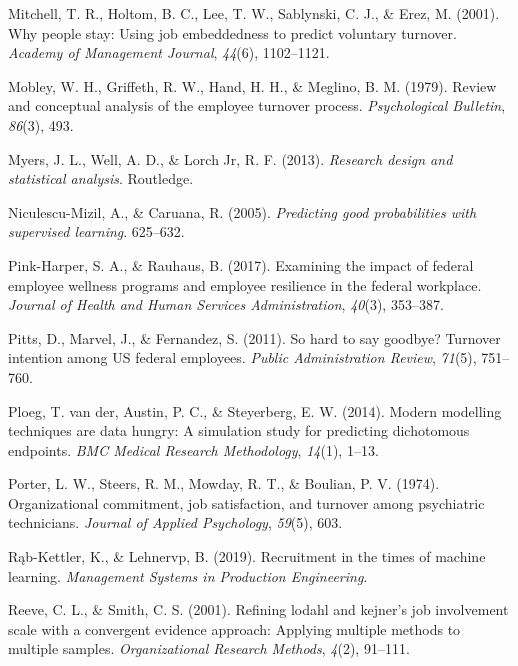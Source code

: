 \documentclass[
  man]{apa7}
\newlength{\cslhangindent}
\newlength{\cslentryspacingunit} %
\newenvironment{CSLReferences}[2] %
 {%
  \setlength{\parindent}{0pt}
  \ifodd #1
  \let\oldpar\par
  \def\par{\hangindent=\cslhangindent\oldpar}
  \fi
  \setlength{\parskip}{#2\cslentryspacingunit}
 }%
 {}
\begin{document}
\begin{CSLReferences}{1}{0}
\leavevmode{}%
Mitchell, T. R., Holtom, B. C., Lee, T. W., Sablynski, C. J., \& Erez, M. (2001). Why people stay: Using job embeddedness to predict voluntary turnover. \emph{Academy of Management Journal}, \emph{44}(6), 1102--1121.

\leavevmode{}%
Mobley, W. H., Griffeth, R. W., Hand, H. H., \& Meglino, B. M. (1979). Review and conceptual analysis of the employee turnover process. \emph{Psychological Bulletin}, \emph{86}(3), 493.

\leavevmode{}%
Myers, J. L., Well, A. D., \& Lorch Jr, R. F. (2013). \emph{Research design and statistical analysis}. Routledge.

\leavevmode{}%
Niculescu-Mizil, A., \& Caruana, R. (2005). \emph{Predicting good probabilities with supervised learning}. 625--632.

\leavevmode{}%
Pink-Harper, S. A., \& Rauhaus, B. (2017). Examining the impact of federal employee wellness programs and employee resilience in the federal workplace. \emph{Journal of Health and Human Services Administration}, \emph{40}(3), 353--387.

\leavevmode{}%
Pitts, D., Marvel, J., \& Fernandez, S. (2011). So hard to say goodbye? Turnover intention among US federal employees. \emph{Public Administration Review}, \emph{71}(5), 751--760.

\leavevmode{}%
Ploeg, T. van der, Austin, P. C., \& Steyerberg, E. W. (2014). Modern modelling techniques are data hungry: A simulation study for predicting dichotomous endpoints. \emph{BMC Medical Research Methodology}, \emph{14}(1), 1--13.

\leavevmode{}%
Porter, L. W., Steers, R. M., Mowday, R. T., \& Boulian, P. V. (1974). Organizational commitment, job satisfaction, and turnover among psychiatric technicians. \emph{Journal of Applied Psychology}, \emph{59}(5), 603.

\leavevmode{}%
Rąb-Kettler, K., \& Lehnervp, B. (2019). Recruitment in the times of machine learning. \emph{Management Systems in Production Engineering}.

\leavevmode{}%
Reeve, C. L., \& Smith, C. S. (2001). Refining lodahl and kejner's job involvement scale with a convergent evidence approach: Applying multiple methods to multiple samples. \emph{Organizational Research Methods}, \emph{4}(2), 91--111.


\end{CSLReferences}
\end{document}
